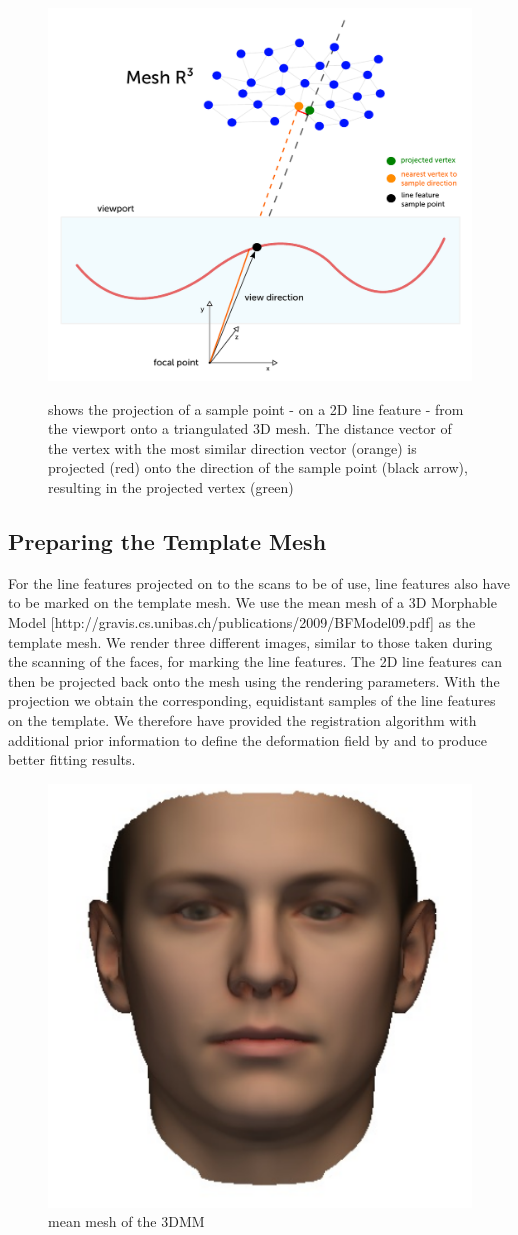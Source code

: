 \begin{figure}[h!]
    \includegraphics[width=\textwidth]{./resources/figures/projection.pdf}
\label{fig:projection}
\caption{shows the projection of a sample point - on a 2D line feature - from the viewport onto a triangulated 3D mesh. The distance vector of the vertex with the most similar direction vector (orange) is projected (red) onto the direction of the sample point (black arrow), resulting in the projected vertex (green)}
\end{figure}
\subsection{Preparing the Template Mesh}
For the line features projected on to the scans to be of use, line features also have to be marked on the template mesh. We use the mean mesh of a 3D Morphable Model [http://gravis.cs.unibas.ch/publications/2009/BFModel09.pdf] as the template mesh.
We render three different images, similar to those taken during the scanning of the faces, for marking the line features.
The 2D line features can then be projected back onto the mesh using the rendering parameters. With the projection we obtain the corresponding, equidistant samples of the line features on the template. We therefore have provided the registration algorithm with additional prior information to define the deformation field by and to produce better fitting results.
\begin{figure}
    \includegraphics[width=.2\textwidth]{./resources/img/mean_msh.pdf}
    \caption{mean mesh of the 3DMM}
\end{figure}

